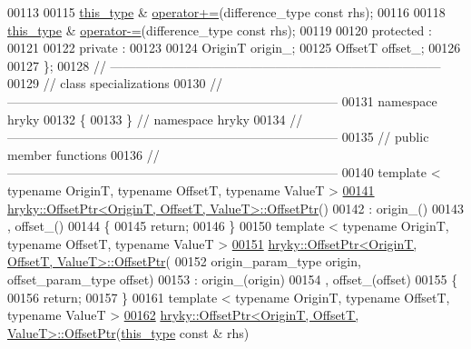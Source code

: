 \begin{DoxyCode}
00113 
00115     \hyperlink{classhryky_1_1_offset_ptr}{this_type} & \hyperlink{classhryky_1_1_offset_ptr_a1f855447fc5886b2518be1f89d9f686b}{operator+=}(difference\_type \textcolor{keyword}{const} rhs);
00116 
00118     \hyperlink{classhryky_1_1_offset_ptr}{this_type} & \hyperlink{classhryky_1_1_offset_ptr_a5dcfac7df68c6d273ca319a8cc79352d}{operator-=}(difference\_type \textcolor{keyword}{const} rhs);
00119 
00120 \textcolor{keyword}{protected} :
00121 
00122 \textcolor{keyword}{private} :
00123 
00124     OriginT     origin\_;
00125     OffsetT     offset\_;
00126 
00127 \};
00128 \textcolor{comment}{//
      ------------------------------------------------------------------------------}
00129 \textcolor{comment}{// class specializations}
00130 \textcolor{comment}{//
      ------------------------------------------------------------------------------}
00131 \textcolor{keyword}{namespace }hryky
00132 \{
00133 \} \textcolor{comment}{// namespace hryky}
00134 \textcolor{comment}{//
      ------------------------------------------------------------------------------}
00135 \textcolor{comment}{// public member functions}
00136 \textcolor{comment}{//
      ------------------------------------------------------------------------------}
00140 \textcolor{comment}{}\textcolor{keyword}{template} < \textcolor{keyword}{typename} OriginT, \textcolor{keyword}{typename} OffsetT, \textcolor{keyword}{typename} ValueT >
\hypertarget{offset__ptr_8h_source_l00141}{}\hyperlink{classhryky_1_1_offset_ptr_a81d4ed37b44fd74e8fb82f1e9c8a4814}{00141} \hyperlink{classhryky_1_1_offset_ptr_a81d4ed37b44fd74e8fb82f1e9c8a4814}{hryky::OffsetPtr<OriginT, OffsetT, ValueT>::OffsetPtr}()
00142     : origin\_()
00143       , offset\_()
00144 \{
00145     \textcolor{keywordflow}{return};
00146 \}
00150 \textcolor{keyword}{template} < \textcolor{keyword}{typename} OriginT, \textcolor{keyword}{typename} OffsetT, \textcolor{keyword}{typename} ValueT >
\hypertarget{offset__ptr_8h_source_l00151}{}\hyperlink{classhryky_1_1_offset_ptr_a7c4b76c5d859a5021cac4a0dcd96f88e}{00151} \hyperlink{classhryky_1_1_offset_ptr}{hryky::OffsetPtr<OriginT, OffsetT, ValueT>::OffsetPtr}(
00152     origin\_param\_type origin, offset\_param\_type offset)
00153     : origin\_(origin)
00154       , offset\_(offset)
00155 \{
00156     \textcolor{keywordflow}{return};
00157 \}
00161 \textcolor{keyword}{template} < \textcolor{keyword}{typename} OriginT, \textcolor{keyword}{typename} OffsetT, \textcolor{keyword}{typename} ValueT >
\hypertarget{offset__ptr_8h_source_l00162}{}\hyperlink{classhryky_1_1_offset_ptr_a90d9540e04e9f55a5a56af20e8d6b96e}{00162} \hyperlink{classhryky_1_1_offset_ptr}{hryky::OffsetPtr<OriginT, OffsetT, ValueT>::OffsetPtr}(\hyperlink{classhryky_1_1_offset_ptr}{this_type} \textcolor{keyword}{const} & rhs)

\end{DoxyCode}
